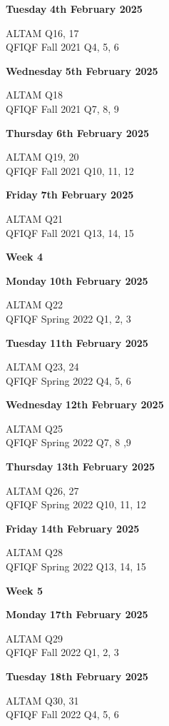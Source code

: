 \documentclass[hidelinks, 12pt]{article}
\theoremstyle{mydefstyle}
\theoremstyle{mythmstyle}
\begin{document}
\textbf{Tuesday} \hfill \textbf{4th February 2025}

ALTAM Q16, 17 \\
QFIQF Fall 2021 Q4, 5, 6

\textbf{Wednesday} \hfill \textbf{5th February 2025}

ALTAM Q18 \\
QFIQF Fall 2021 Q7, 8, 9

\textbf{Thursday} \hfill \textbf{6th February 2025}

ALTAM Q19, 20 \\
QFIQF Fall 2021 Q10, 11, 12

\textbf{Friday} \hfill \textbf{7th February 2025}

ALTAM Q21 \\
QFIQF Fall 2021 Q13, 14, 15

\begin{center}
\textbf{Week 4}
\end{center}

\textbf{Monday} \hfill \textbf{10th February 2025}

ALTAM Q22 \\
QFIQF Spring 2022 Q1, 2, 3

\textbf{Tuesday} \hfill \textbf{11th February 2025}

ALTAM Q23, 24 \\
QFIQF Spring 2022 Q4, 5, 6

\textbf{Wednesday} \hfill \textbf{12th February 2025}

ALTAM Q25 \\
QFIQF Spring 2022 Q7, 8 ,9

\textbf{Thursday} \hfill \textbf{13th February 2025}

ALTAM Q26, 27 \\
QFIQF Spring 2022 Q10, 11, 12

\textbf{Friday} \hfill \textbf{14th February 2025}

ALTAM Q28 \\
QFIQF Spring 2022 Q13, 14, 15

\begin{center}
\textbf{Week 5}
\end{center}

\textbf{Monday} \hfill \textbf{17th February 2025}

ALTAM Q29 \\
QFIQF Fall 2022 Q1, 2, 3

\textbf{Tuesday} \hfill \textbf{18th February 2025}

ALTAM Q30, 31 \\
QFIQF Fall 2022 Q4, 5, 6
\end{document}
